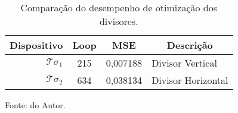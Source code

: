 



\begin{table}[H]
    \centering
    \caption{Comparação do desempenho de otimização dos divisores.}
    \begin{tabular}{rccl}
    \hline
\multicolumn{1}{c}{Dispositivo} & Loop & MSE               & \multicolumn{1}{c}{Descrição} \\ \hline
$\mathcal{T}\sigma_{1}$         & 215  & 0,007188          & Divisor Vertical              \\
$\mathcal{T}\sigma_{2}$         & 634  & 0,038134          & Divisor Horizontal            \\ \hline
\end{tabular}

    \label{tab: MSEDivisor}

    \vspace{2.5mm}
    Fonte: do Autor.

    \end{table}